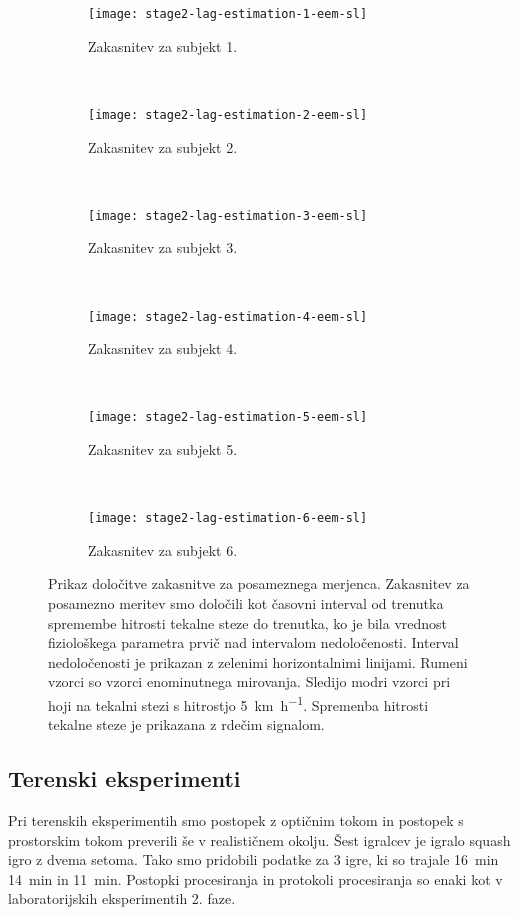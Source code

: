 \begin{figure}[!htbp]
	\centering
	\begin{subfigure}[t]{0.45\columnwidth}
		\texttt{[image: stage2-lag-estimation-1-eem-sl]}
		\caption{Zakasnitev za subjekt 1.}
		\label{fig:lag-estimation-1-eem}
	\end{subfigure}
	~
	\begin{subfigure}[t]{0.45\columnwidth}
		\texttt{[image: stage2-lag-estimation-2-eem-sl]}
		\caption{Zakasnitev za subjekt 2.}
		\label{fig:lag-estimation-2-eem}
	\end{subfigure}
	~
	\begin{subfigure}[t]{0.45\columnwidth}
		\texttt{[image: stage2-lag-estimation-3-eem-sl]}
		\caption{Zakasnitev za subjekt 3.}
		\label{fig:lag-estimation-3-eem}
	\end{subfigure}
	~
	\begin{subfigure}[t]{0.45\columnwidth}
		\texttt{[image: stage2-lag-estimation-4-eem-sl]}
		\caption{Zakasnitev za subjekt 4.}
		\label{fig:lag-estimation-4-eem}
	\end{subfigure}
	~
	\begin{subfigure}[t]{0.45\columnwidth}
		\texttt{[image: stage2-lag-estimation-5-eem-sl]}
		\caption{Zakasnitev za subjekt 5.}
		\label{fig:lag-estimation-5-eem}
	\end{subfigure}
	~
	\begin{subfigure}[t]{0.45\columnwidth}
		\texttt{[image: stage2-lag-estimation-6-eem-sl]}
		\caption{Zakasnitev za subjekt 6.}
		\label{fig:lag-estimation-6-eem}
	\end{subfigure}
	\caption[Prikaz določitve zakasnitve za posameznega merjenca]{Prikaz določitve zakasnitve za posameznega merjenca. Zakasnitev za posamezno meritev smo določili kot časovni interval od trenutka spremembe hitrosti tekalne steze do trenutka, ko je bila vrednost fiziološkega parametra prvič nad intervalom nedoločenosti. Interval nedoločenosti je prikazan z zelenimi horizontalnimi linijami. Rumeni vzorci so vzorci enominutnega mirovanja. Sledijo modri vzorci pri hoji na tekalni stezi s hitrostjo \SI{5}{\km\per\hour}. Spremenba hitrosti tekalne steze je prikazana z rdečim signalom.}
	\label{fig:lag-estimation-stage2}
\end{figure}










\subsection{Terenski eksperimenti}
Pri terenskih eksperimentih smo postopek z optičnim tokom in postopek s prostorskim tokom preverili še v realističnem okolju. Šest igralcev je igralo squash igro z dvema setoma. Tako smo pridobili podatke za 3 igre, ki so trajale \SI{16}{min} \SI{14}{min} in \SI{11}{min}. Postopki procesiranja in protokoli procesiranja so enaki kot v laboratorijskih eksperimentih 2. faze. 



